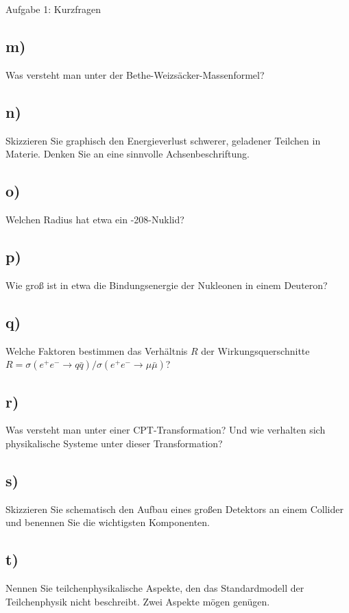 \begin{aufgabe}{Aufgabe 1: Kurzfragen}
    \subsection{m)}
    Was versteht man unter der Bethe-Weizsäcker-Massenformel?

    \subsection{n)}
    Skizzieren Sie graphisch den Energieverlust schwerer, geladener Teilchen in Materie.
    Denken Sie an eine sinnvolle Achsenbeschriftung.

    \subsection{o)}
    Welchen Radius hat etwa ein -208-Nuklid?

    \subsection{p)}
    Wie groß ist in etwa die Bindungsenergie der Nukleonen in einem Deuteron?

    \subsection{q)}
    Welche Faktoren bestimmen das Verhältnis $R$ der Wirkungsquerschnitte
    $R = \sigma(e^+e^- \to q\bar q) / \sigma(e^+e^- \to \mu\bar \mu)$?

    \subsection{r)}
    Was versteht man unter einer CPT-Transformation?
    Und wie verhalten sich physikalische Systeme unter dieser Transformation?

    \subsection{s)}
    Skizzieren Sie schematisch den Aufbau eines großen Detektors an einem Collider
    und benennen Sie die wichtigsten Komponenten.

    \subsection{t)}
    Nennen Sie teilchenphysikalische Aspekte,
    den das Standardmodell der Teilchenphysik nicht beschreibt.
    Zwei Aspekte mögen genügen.
\end{aufgabe}

